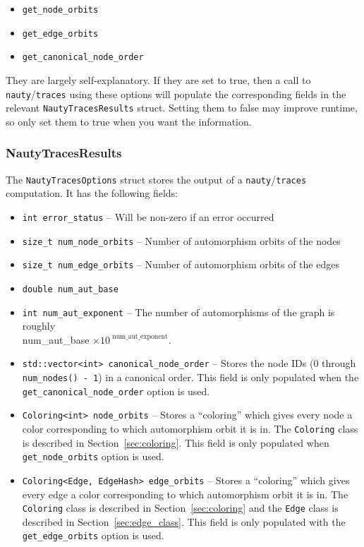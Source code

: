 \documentclass{article}
\begin{document}
\begin{itemize}
    \setlength\itemsep{-0.1em}
    \item \verb|get_node_orbits|
    \item \verb|get_edge_orbits|
    \item \verb|get_canonical_node_order|
\end{itemize}

They are largely self-explanatory. If they are set to true, then a call to \verb|nauty|/\verb|traces| using these options will populate the corresponding fields in the relevant \verb|NautyTracesResults| struct. Setting them to false may improve runtime, so only set them to true when you want the information.

\subsubsection{NautyTracesResults}

The \verb|NautyTracesOptions| struct stores the output of a \verb|nauty|/\verb|traces| computation. It has the following fields:


\begin{itemize}
    \setlength\itemsep{-0.1em}
    \item \verb|int error_status| -- Will be non-zero if an error occurred
    \item \verb|size_t num_node_orbits| -- Number of automorphism orbits of the nodes
    \item \verb|size_t num_edge_orbits| -- Number of automorphism orbits of the edges
    \item \verb|double num_aut_base|
    \item \verb|int num_aut_exponent| -- The number of automorphisms of the graph is roughly \\
    {\large num\_aut\_base $\times 10^\text{ num\_aut\_exponent}$}.
    \item \verb|std::vector<int> canonical_node_order| -- Stores the node IDs (0 through \verb|num_nodes() - 1|) in a canonical order. This field is only populated when the \verb|get_canonical_node_order| option is used.
    \item \verb|Coloring<int> node_orbits| -- Stores a ``coloring'' which gives every node a color corresponding to which automorphism orbit it is in. The \verb|Coloring| class is described in Section~\ref{sec:coloring}. This field is only populated when \verb|get_node_orbits| option is used.
    \item \verb|Coloring<Edge, EdgeHash> edge_orbits| -- Stores a ``coloring'' which gives every edge a color corresponding to which automorphism orbit it is in. The \verb|Coloring| class is described in Section~\ref{sec:coloring} and the \verb|Edge| class is described in Section~\ref{sec:edge_class}. This field is only populated with the \verb|get_edge_orbits| option is used.
\end{itemize}
\end{document}
